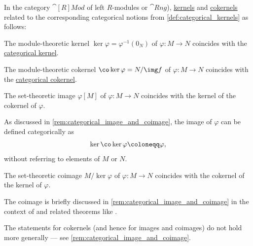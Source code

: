 \begin{proposition}\label{thm:module_categorical_kernels}
  In the category \hyperref[def:module/category]{\( \cat[R]{Mod} \)} of left \( R \)-modules or \hyperref[def:ring/category]{\( \cat{Rng} \)}), \hyperref[def:module/kernel]{kernels} and \hyperref[def:module_cokernel]{cokernels} related to the corresponding categorical notions from \cref{def:categorical_kernels} as follows:
  \begin{thmenum}
     The module-theoretic kernel \( \ker \varphi = \varphi^{-1}(0_N) \) of \( \varphi: M \to N \) coincides with the \hyperref[def:categorical_kernels/kernel]{categorical kernel}.

     The module-theoretic cokernel \( \co\ker \varphi = N / \img f \) of \( \varphi: M \to N \) coincides with the \hyperref[def:categorical_kernels/cokernel]{categorical cokernel}.

     The set-theoretic image \( \varphi[M] \) of \( \varphi: M \to N \) coincides with the kernel of the cokernel of \( \varphi \).

    As discussed in \cref{rem:categorical_image_and_coimage}, the image of \( \varphi \) can be defined categorically as
    \begin{equation*}
      \ker \co\ker \varphi \coloneqq \varphi,
    \end{equation*}
    without referring to elements of \( M \) or \( N \).

     The set-theoretic coimage \( M / \ker \varphi \) of \( \varphi: M \to N \) coincides with the cokernel of the kernel of \( \varphi \).

    The coimage is briefly discussed in \cref{rem:categorical_image_and_coimage} in the context of  and related theorems like .
  \end{thmenum}
\end{proposition}
\begin{comments}
  \item The statements for cokernels (and hence for images and coimages) do not hold more generally --- see \cref{rem:categorical_image_and_coimage}.
\end{comments}
